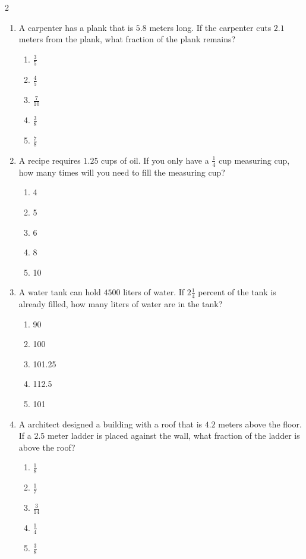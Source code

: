\documentclass[10pt]{article}
\begin{document}
\begin{multicols}{2}
\begin{enumerate}[label=\textbf{Q\arabic*.}, leftmargin=*, itemsep=6pt, parsep=0pt]
  \item \small A carpenter has a plank that is $5.8$ meters long. If the carpenter cuts $2.1$ meters from the plank, what fraction of the plank remains?
  \begin{enumerate}[label=(\Alph*), leftmargin=0.6cm, nosep, itemsep=2pt]
    \item $\frac{3}{5}$
    \item $\frac{4}{5}$
    \item $\frac{7}{10}$
    \item $\frac{3}{8}$
    \item $\frac{7}{8}$
  \end{enumerate}

  \item \small A recipe requires $1.25$ cups of oil. If you only have a $\frac{1}{4}$ cup measuring cup, how many times will you need to fill the measuring cup?
  \begin{enumerate}[label=(\Alph*), leftmargin=0.6cm, nosep, itemsep=2pt]
    \item 4
    \item 5
    \item 6
    \item 8
    \item 10
  \end{enumerate}

  \item \small A water tank can hold $4500$ liters of water. If $2 \frac{1}{4}$ percent of the tank is already filled, how many liters of water are in the tank?
  \begin{enumerate}[label=(\Alph*), leftmargin=0.6cm, nosep, itemsep=2pt]
    \item 90
    \item 100
    \item 101.25
    \item 112.5
    \item 101
  \end{enumerate}

  \item \small A architect designed a building with a roof that is $4.2$ meters above the floor. If a $2.5$ meter ladder is placed against the wall, what fraction of the ladder is above the roof?
  \begin{enumerate}[label=(\Alph*), leftmargin=0.6cm, nosep, itemsep=2pt]
    \item $\frac{1}{8}$
    \item $\frac{1}{7}$
    \item $\frac{3}{14}$
    \item $\frac{1}{4}$
    \item $\frac{3}{8}$
  \end{enumerate}


\end{enumerate}
\end{multicols}
\end{document}

